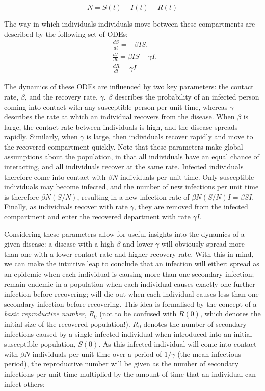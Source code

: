 \documentclass[11pt, a4paper, oneside,titlepage]{article}
\begin{document}
\begin{equation*}
N = S(t) + I(t) + R(t)
\end{equation*}

The way in which individuals individuals move between these compartments are described by the following set of ODEs:
\begin{equation*}
	\begin{split}
	&\frac{dS}{dt} = -\beta IS, \\
	&\frac{dI}{dt} = \beta IS - \gamma I, \\
	&\frac{dR}{dt} = \gamma I
	\end{split}
\end{equation*}

The dynamics of these ODEs are influenced by two key parameters: the contact rate, $\beta$, and the recovery rate, $\gamma$. $\beta$ describes the probability of an infected person coming into contact with any susceptible person per unit time, whereas $\gamma$ describes the rate at which an individual recovers from the disease. When $\beta$ is large, the contact rate between individuals is high, and the disease spreads rapidly. Similarly, when $\gamma$ is large, then individuals recover rapidly and move to the recovered compartment quickly. Note that these parameters make global assumptions about the population, in that all individuals have an equal chance of interacting, and all individuals recover at the same rate. Infected individuals therefore come into contact with $\beta$$N$ individuals per unit time. Only susceptible individuals may become infected, and the number of new infections per unit time is therefore $\beta$$N(S/N)$, resulting in a new infection rate of $\beta$$N(S/N)I = $$\beta$$SI$. Finally, as individuals recover with rate $\gamma$, they are removed from the infected compartment and enter the recovered department with rate $\gamma I$.

Considering these parameters allow for useful insights into the dynamics of a given disease: a disease with a high $\beta$ and lower $\gamma$ will obviously spread more than one with a lower contact rate and higher recovery rate. With this in mind, we can make the intuitive leap to conclude that an infection will either: spread as an epidemic when each individual is causing more than one secondary infection; remain endemic in a population when each individual causes exactly one further infection before recovering; will die out when each individual causes less than one secondary infection before recovering. This idea is formalised by the concept of a \emph{basic reproductive number}, $R_0$ (not to be confused with $R(0)$, which denotes the initial size of the recovered population!). $R_0$ denotes the number of secondary infections caused by a single infected individual when introduced into an initial susceptible population, $S(0)$. As this infected individual will come into contact with $\beta N$ individuals per unit time over a period of $1/$$\gamma$ (the mean infectious period), the reproductive number will be given as the number of secondary infections per unit time multiplied by the amount of time that an individual can infect others:\cite{anderson, diekmann}
\end{document}
